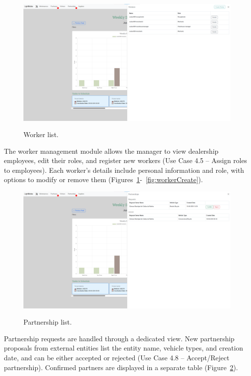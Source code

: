 \begin{figure}[h]
  \caption{Worker list.}
  \centering
  \includegraphics[width=\textwidth]{figs/Implementation/workshopmanager/workerList}
  \label{fig:workerList}
\end{figure}




The worker management module allows the manager to view dealership employees, edit their roles, and register new workers (Use Case 4.5 – Assign roles to employees). Each worker's details include personal information and role, with options to modify or remove them (Figures~\ref{fig:workerList}-~\ref{fig:workerCreate}).


\begin{figure}[h]
  \caption{Partnership list.}
  \centering
  \includegraphics[width=\textwidth]{figs/Implementation/workshopmanager/partnershipList}
  \label{fig:partnershipList}
\end{figure}


Partnership requests are handled through a dedicated view. New partnership proposals from external entities list the entity name, vehicle types, and creation date, and can be either accepted or rejected (Use Case 4.8 – Accept/Reject partnership). Confirmed partners are displayed in a separate table (Figure~\ref{fig:partnershipList}).

